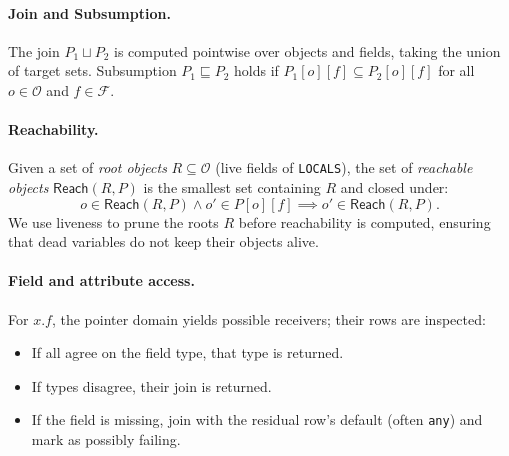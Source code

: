 \paragraph{Join and Subsumption.}
The join $P_1 \sqcup P_2$ is computed pointwise over objects and fields, taking the union of target sets.
Subsumption $P_1 \sqsubseteq P_2$ holds if $P_1[o][f] \subseteq P_2[o][f]$ for all $o \in \mathcal{O}$ and $f \in \mathcal{F}$.

\paragraph{Reachability.}
Given a set of \emph{root objects} $R \subseteq \mathcal{O}$ (live fields of \texttt{LOCALS}), the set of \emph{reachable objects} $\mathsf{Reach}(R, P)$ is the smallest set containing $R$ and closed under:
\[
o \in \mathsf{Reach}(R, P) \wedge o' \in P[o][f] \implies o' \in \mathsf{Reach}(R, P).
\]
We use liveness to prune the roots $R$ before reachability is computed, ensuring that dead variables do not keep their objects alive.

\paragraph{Field and attribute access.}
For $x.f$, the pointer domain yields possible receivers; their rows are inspected:
\begin{itemize}
  \item If all agree on the field type, that type is returned.
  \item If types disagree, their join is returned.
  \item If the field is missing, join with the residual row's default (often \texttt{any}) and mark as possibly failing.
\end{itemize}


